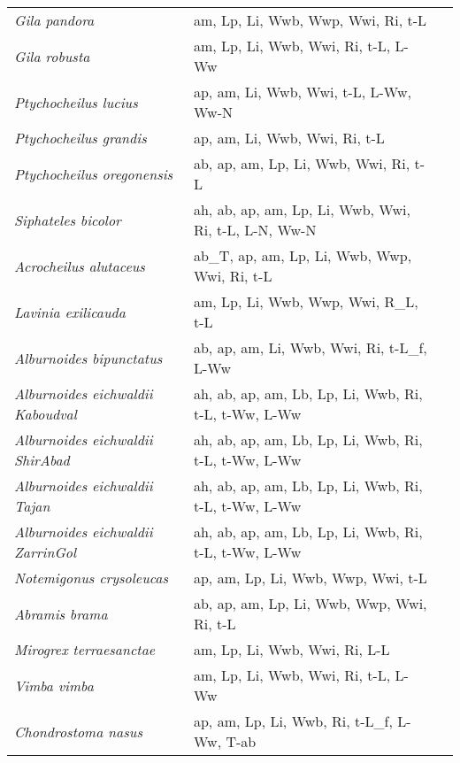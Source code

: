 {\begin{longtable}[c]{p{3.5cm}p{5.5cm}p{5.5cm}}
\emph{Gila pandora} &  am, Lp, Li, Wwb, Wwp, Wwi, Ri, t-L &  \\
\emph{Gila robusta} &  am, Lp, Li, Wwb, Wwi, Ri, t-L, L-Ww & \citet{VaniKram1969} \\
\emph{Ptychocheilus lucius} &  ap, am, Li, Wwb, Wwi, t-L, L-Ww, Ww-N & \citet{ValdRyel2002,Insl1983,VaniKram1969} \\
\emph{Ptychocheilus grandis} &  ap, am, Li, Wwb, Wwi, Ri, t-L & \citet{Insl1983,Brow1990} \\
\emph{Ptychocheilus oregonensis} &  ab, ap, am, Lp, Li, Wwb, Wwi, Ri, t-L & \citet{Beam1992,Garc2014} \\
\emph{Siphateles bicolor} &  ah, ab, ap, am, Lp, Li, Wwb, Wwi, Ri, t-L, L-N, Ww-N & \citet{ArchBona2009,Bird1975,Kuce1978} \\
\emph{Acrocheilus alutaceus} &  ab\_T, ap, am, Lp, Li, Wwb, Wwp, Wwi, Ri, t-L & \citet{MoodLind1972} \\
\emph{Lavinia exilicauda} &  am, Lp, Li, Wwb, Wwp, Wwi, R\_L, t-L & \citet{GearMoyl1980} \\
\emph{Alburnoides bipunctatus} &  ab, ap, am, Li, Wwb, Wwi, Ri, t-L\_f, L-Ww & \citet{BeekEmme2005} \\
\emph{Alburnoides eichwaldii Kaboudval} &  ah, ab, ap, am, Lb, Lp, Li, Wwb, Ri, t-L, t-Ww, L-Ww & \citet{AbbaGhor2010,BeekEmme2007} \\
\emph{Alburnoides eichwaldii ShirAbad} &  ah, ab, ap, am, Lb, Lp, Li, Wwb, Ri, t-L, t-Ww, L-Ww & \citet{AbbaGhor2010,BeekEmme2007} \\
\emph{Alburnoides eichwaldii Tajan} &  ah, ab, ap, am, Lb, Lp, Li, Wwb, Ri, t-L, t-Ww, L-Ww & \citet{EsmaRahm2012,KeivNasr2016,BeekEmme2007} \\
\emph{Alburnoides eichwaldii ZarrinGol} &  ah, ab, ap, am, Lb, Lp, Li, Wwb, Ri, t-L, t-Ww, L-Ww & \citet{EsmaRahm2010,BeekEmme2007} \\
\emph{Notemigonus crysoleucas} &  ap, am, Lp, Li, Wwb, Wwp, Wwi, t-L & \citet{JohaMcQu1989} \\
\emph{Abramis brama} &  ab, ap, am, Lp, Li, Wwb, Wwp, Wwi, Ri, t-L & \citet{Emme2008,ZhanXiel2016} \\
\emph{Mirogrex terraesanctae} &  am, Lp, Li, Wwb, Wwi, Ri, L-L & \citet{OstrWall1999} \\
\emph{Vimba vimba} &  am, Lp, Li, Wwb, Wwi, Ri, t-L, L-Ww & \citet{OkgeElp2011,WiesSchi1992} \\
\emph{Chondrostoma nasus} &  ap, am, Lp, Li, Wwb, Ri, t-L\_f, L-Ww, T-ab & \citet{Beek2007} \\

\end{longtable}}
